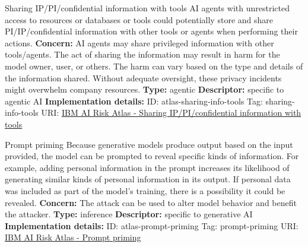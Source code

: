 \begin{definitionbox}{Sharing IP/PI/confidential information with tools}
AI agents with unrestricted access to resources or databases or tools could potentially store and share PI/IP/confidential information with other tools or agents when performing their actions.\newline\newline
\textbf{Concern: }AI agents may share privileged information with other tools/agents. The act of sharing the information may result in harm for the model owner, user, or others. The harm can vary based on the type and details of the information shared. Without adequate oversight, these privacy incidents might overwhelm company resources.\newline\newline
\textbf{Type: }agentic\newline
\textbf{Descriptor: }specific to agentic AI \newline\newline
\textbf{Implementation details: } \newline
ID: atlas-sharing-info-tools \newline
Tag: sharing-info-tools \newline
URI:  \href{https://www.ibm.com/docs/en/watsonx/saas?topic=SSYOK8/wsj/ai-risk-atlas/sharing-info-tools.html}{IBM AI Risk Atlas - Sharing IP/PI/confidential information with tools}\newline
\end{definitionbox}
\begin{definitionbox}{Prompt priming}
Because generative models produce output based on the input provided, the model can be prompted to reveal specific kinds of information. For example, adding personal information in the prompt increases its likelihood of generating similar kinds of personal information in its output. If personal data was included as part of the model's training, there is a possibility it could be revealed.\newline\newline
\textbf{Concern: }The attack can be used to alter model behavior and benefit the attacker.\newline\newline
\textbf{Type: }inference\newline
\textbf{Descriptor: }specific to generative AI \newline\newline
\textbf{Implementation details: } \newline
ID: atlas-prompt-priming \newline
Tag: prompt-priming \newline
URI:  \href{https://www.ibm.com/docs/en/watsonx/saas?topic=SSYOK8/wsj/ai-risk-atlas/prompt-priming.html}{IBM AI Risk Atlas - Prompt priming}\newline
\end{definitionbox}
